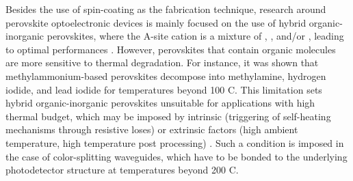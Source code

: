 Besides the use of spin-coating as the fabrication technique, research around perovskite optoelectronic devices is mainly focused on the use of hybrid organic-inorganic perovskites, where the A-site cation is a mixture of , , and/or , leading to optimal performances \cite{Zhang2021All-inorganicCells}. However, perovskites that contain organic molecules are more sensitive to thermal degradation. For instance, it was shown that methylammonium-based perovskites decompose into methylamine, hydrogen iodide, and lead iodide for temperatures beyond 100 \degree C. This limitation sets hybrid organic-inorganic perovskites unsuitable for applications with high thermal budget, which may be imposed by intrinsic (triggering of self-heating mechanisms through resistive loses) or extrinsic factors (high ambient temperature, high temperature post processing) \cite{Handa2019LargePerovskite, Dong2021SupportingFilm, Li2022StructureTemperatures}. Such a condition is imposed in the case of color-splitting waveguides, which have to be bonded to the underlying photodetector structure at temperatures beyond 200 \degree C. 

